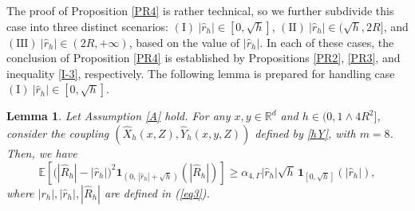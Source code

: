 \documentclass[aap]{imsart}
\theoremstyle{plain}
\newtheorem{lemma}[theorem]{Lemma}
\theoremstyle{definition}
\begin{document}
The proof of Proposition \ref{PR4} is rather technical, so we further subdivide this case  into three distinct scenarios:  \underline{$(\mathrm{I})~|\hat{r}_h|\in[0, \sqrt{h}]$}, \underline{$(\mathrm{II})~|\hat{r}_h|\in(\sqrt{h}, 2R]$}, and \underline{$(\mathrm{III})~|\hat{r}_h|\in(2R, +\infty)$}, based on the value of $|\hat{r}_h|$. In each of these cases, the conclusion of Proposition \ref{PR4} is established by Propositions \ref{PR2}, \ref{PR3}, and inequality \eqref{I-3}, respectively. The following lemma is prepared for handling case \underline{$(\mathrm{I})~|\hat{r}_h|\in[0, \sqrt{h}]$}.
\begin{lemma}\label{Le10}
Let Assumption \ref{A} hold. For any
\(x,y\in\mathbb R^d\) and \(h\in(0,1\wedge 4R^2]\),	consider the coupling \((\hat X_h(x,Z),\hat Y_h(x,y,Z))\) defined by \eqref{hY}, with \(m=8\). Then, we have
	\[\mathbb E\left[
		\bigl(|\hat R_h|-|\hat r_h|\bigr)^2
		\mathbf 1_{(0,\,|\hat r_h|+\sqrt h)}
		(|\hat R_h|)
		\right]\geqslant
		\alpha_{4,\Gamma}
		|\hat r_h|\sqrt h\,
		\mathbf 1_{[0,\sqrt h]}(|\hat r_h|),\]
	where $|r_h|, |\hat{r}_h|, |\hat{R}_h|$ are defined in (\ref{eq3}).
\end{lemma}
\end{document}
